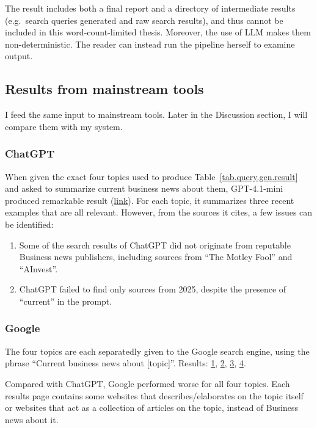 \documentclass[final-report]{report-template}
\begin{document}
The result includes both a final report and a directory of intermediate results
(e.g.\ search queries generated and raw search results), and thus cannot be
included in this word-count-limited thesis. Moreover, the use of LLM makes them
non-deterministic. The reader can instead run the pipeline herself to examine
output.

\subsection{Results from mainstream tools}
I feed the same input to mainstream tools. Later in the Discussion section, I
will compare them with my system.

\subsubsection{ChatGPT}
When given the exact four topics used to produce
Table~\ref{tab.query.gen.result} and asked to summarize current business news
about them, GPT-4.1-mini produced remarkable result
(\href{https://chatgpt.com/share/689a428d-f01c-8011-a115-57b4ca19a278}{link}).
For each topic, it summarizes three recent examples that are all relevant.
However, from the sources it cites, a few issues can be identified:
\begin{enumerate}
	\item Some of the search results of ChatGPT did not originate from
		reputable Business news publishers, including sources from ``The Motley
		Fool'' and ``AInvest''.
	\item ChatGPT failed to find only sources from 2025, despite the presence of
		``current'' in the prompt.
\end{enumerate}

\subsubsection{Google}
The four topics are each separatedly given to the Google search engine, using
the phrase ``Current business news about [topic]''. Results: 
\href{https://www.google.com/search?q=Current+business+news+about+vertical+integration}{1}, 
\href{https://www.google.com/search?q=Current+business+news+about+diversification+strategies}{2}, 
\href{https://www.google.com/search?q=Current+business+news+about+competitive+advantage}{3}, 
\href{https://www.google.com/search?q=Current+business+news+about+foreign+direct+investment}{4}.

Compared with ChatGPT, Google performed worse for all four topics. Each
results page contains some websites that describes/elaborates on the topic
itself or websites that act as a collection of articles on the topic, instead
of Business news about it. 
\end{document}
